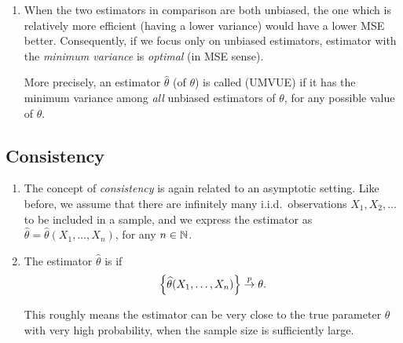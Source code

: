 \begin{enumerate}
\item When the two estimators in comparison are both unbiased, the one which is
relatively more efficient (having a lower variance) would have a lower MSE
 better. Consequently, if we focus only on unbiased
estimators, estimator with the \emph{minimum variance} is \emph{optimal} (in
MSE sense).

More precisely, an estimator \(\widehat{\theta}\) (of \(\theta\)) is called
 (UMVUE) if it has the
minimum variance among \emph{all} unbiased estimators of \(\theta\), for any possible value of \(\theta\).

\end{enumerate}
\subsection{Consistency}
\begin{enumerate}
\item The concept of \emph{consistency} is again related to an asymptotic
setting. Like before, we assume that there are infinitely many i.i.d.\
observations \(X_1,X_2,\dotsc\) to be included in a sample, and we express the
estimator as \(\widehat{\theta}=\widehat{\theta}(X_1,\dotsc,X_n)\), for any
\(n\in\mathbb{N}\).

\item The estimator \(\widehat{\theta}\) is  if
\[
\left\{\widehat{\theta}(X_1,\dotsc,X_n)\right\}\overset{p}{\to} \theta.
\]
\begin{note}
This roughly means the estimator can be very close to the true parameter
\(\theta\) with very high probability, when the sample size is sufficiently
large.
\end{note}
\end{enumerate}
